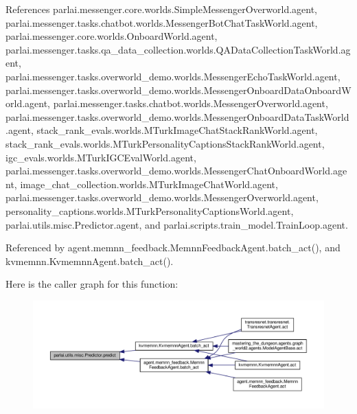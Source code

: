 References parlai.\+messenger.\+core.\+worlds.\+Simple\+Messenger\+Overworld.\+agent, parlai.\+messenger.\+tasks.\+chatbot.\+worlds.\+Messenger\+Bot\+Chat\+Task\+World.\+agent, parlai.\+messenger.\+core.\+worlds.\+Onboard\+World.\+agent, parlai.\+messenger.\+tasks.\+qa\+\_\+data\+\_\+collection.\+worlds.\+Q\+A\+Data\+Collection\+Task\+World.\+agent, parlai.\+messenger.\+tasks.\+overworld\+\_\+demo.\+worlds.\+Messenger\+Echo\+Task\+World.\+agent, parlai.\+messenger.\+tasks.\+overworld\+\_\+demo.\+worlds.\+Messenger\+Onboard\+Data\+Onboard\+World.\+agent, parlai.\+messenger.\+tasks.\+chatbot.\+worlds.\+Messenger\+Overworld.\+agent, parlai.\+messenger.\+tasks.\+overworld\+\_\+demo.\+worlds.\+Messenger\+Onboard\+Data\+Task\+World.\+agent, stack\+\_\+rank\+\_\+evals.\+worlds.\+M\+Turk\+Image\+Chat\+Stack\+Rank\+World.\+agent, stack\+\_\+rank\+\_\+evals.\+worlds.\+M\+Turk\+Personality\+Captions\+Stack\+Rank\+World.\+agent, igc\+\_\+evals.\+worlds.\+M\+Turk\+I\+G\+C\+Eval\+World.\+agent, parlai.\+messenger.\+tasks.\+overworld\+\_\+demo.\+worlds.\+Messenger\+Chat\+Onboard\+World.\+agent, image\+\_\+chat\+\_\+collection.\+worlds.\+M\+Turk\+Image\+Chat\+World.\+agent, parlai.\+messenger.\+tasks.\+overworld\+\_\+demo.\+worlds.\+Messenger\+Overworld.\+agent, personality\+\_\+captions.\+worlds.\+M\+Turk\+Personality\+Captions\+World.\+agent, parlai.\+utils.\+misc.\+Predictor.\+agent, and parlai.\+scripts.\+train\+\_\+model.\+Train\+Loop.\+agent.



Referenced by agent.\+memnn\+\_\+feedback.\+Memnn\+Feedback\+Agent.\+batch\+\_\+act(), and kvmemnn.\+Kvmemnn\+Agent.\+batch\+\_\+act().

Here is the caller graph for this function\+:
\nopagebreak
\begin{figure}[H]
\begin{center}
\leavevmode
\includegraphics[width=350pt]{classparlai_1_1utils_1_1misc_1_1Predictor_a7ff8a927bca43d09d3113dad20cb2a11_icgraph}
\end{center}
\end{figure}


